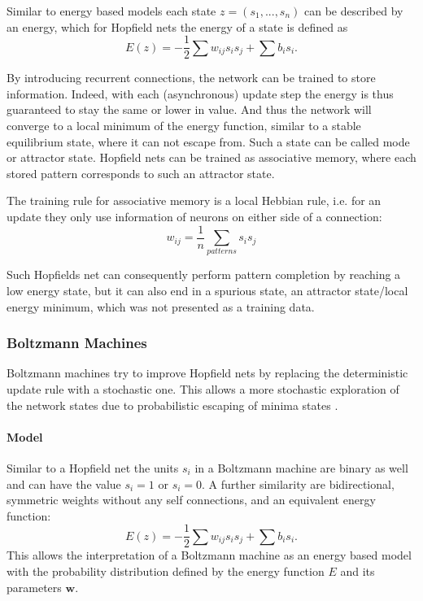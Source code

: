 Similar to energy based models each state $z = (s_1, ... , s_n)$ can be described by an energy, which for Hopfield nets the energy of a state is defined as  
\[
E(z) = - \frac{1}{2} \sum w_{ij} s_i s_j + \sum b_i s_i .
\]


By introducing recurrent connections, the network can be trained to store information.
Indeed, with each (asynchronous) update step the energy is thus guaranteed to stay the same or lower in value.
And thus the network will converge to a local minimum of the energy function, similar to a stable equilibrium state, where it can not escape from. 
Such a state can be called mode or attractor state.
Hopfield nets can be trained as associative memory, where each stored pattern corresponds to such an attractor state.

The training rule for associative memory is a local Hebbian rule, i.e. for an update they only use information of neurons on either side of a connection:
\[
w_{ij} = \frac{1}{n} \sum_{patterns} s_{i} s_{j}
\]

Such Hopfields net can consequently perform pattern completion by reaching a low energy state, but it can also end in a spurious state, an attractor state/local energy minimum, which was not presented as a training data.


\subsubsection{Boltzmann Machines} \label{c:bms}

Boltzmann machines try to improve Hopfield nets by replacing the deterministic update rule with a stochastic one.
This allows a more stochastic exploration of the network states due to probabilistic escaping of minima states \cite{ackley1985learning} \cite{Goodfellow-et-al-2016-Book}.

\paragraph{Model} \label{c:bmmodel}

Similar to a Hopfield net the units $s_i$ in a Boltzmann machine are binary as well and can have the value $s_i = 1$ or $s_i = 0$. 
A further similarity are bidirectional, symmetric weights without any self connections, and an equivalent energy function:
\[
	E(z) = - \frac{1}{2} \sum w_{ij} s_i s_j + \sum b_i s_i .
\]
This allows the interpretation of a Boltzmann machine as an energy based model with the probability distribution defined by the energy function $E$ and its parameters $\textbf{w}$.

